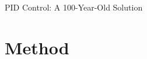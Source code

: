 \documentclass[aspectratio=169, 11pt]{beamer}
\begin{document}
\begin{frame}{PID Control: A 100-Year-Old Solution}
\end{frame}

\section{Method}
\end{document}
